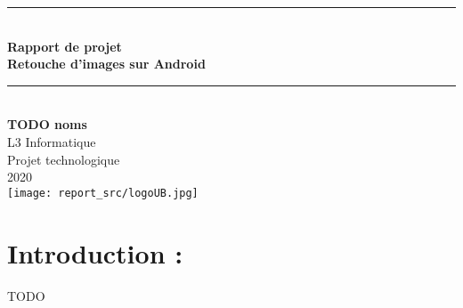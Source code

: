 \documentclass[12pt, a4paper]{article}
\begin{document}
\begin{titlepage}
  \begin{center}

    \rule{\linewidth}{0.5mm} \\[0.4cm]
    { \huge \bfseries {\LARGE{Rapport de projet}}
    \\Retouche d'images sur Android\\[0.4cm] }
    \rule{\linewidth}{0.5mm} \\[1.5cm]
    
    {\LARGE {\textbf{TODO noms}}}\\[0.5cm]
    {\LARGE L3 Informatique}\\[1.5cm]
    
    {\Large Projet technologique}\\[0.5cm]
    {\Large 2020}\\[1.5cm]
    
    \texttt{[image: report\_src/logoUB.jpg]}
    
    
  \end{center}
\end{titlepage}



\tableofcontents
\clearpage 


\section{Introduction :} \label{intro}
TODO

\clearpage


\clearpage


\clearpage


\clearpage


\clearpage
\end{document}

